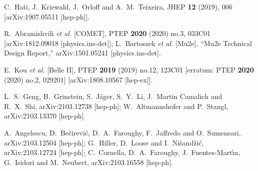 \documentclass[a4paper,11pt]{article}
\begin{document}
\begin{thebibliography}{99}
{
C.~Hati, J.~Kriewald, J.~Orloff and A.~M.~Teixeira,
JHEP \textbf{12} (2019), 006
[arXiv:1907.05511 [hep-ph]].

R.~Abramishvili \textit{et al.} [COMET],
PTEP \textbf{2020} (2020) no.3, 033C01
[arXiv:1812.09018 [physics.ins-det]];
L.~Bartoszek \textit{et al.} [Mu2e],
``Mu2e Technical Design Report,''
arXiv:1501.05241 [physics.ins-det].

E.~Kou \textit{et al.} [Belle II],
PTEP \textbf{2019} (2019) no.12, 123C01
[erratum: PTEP \textbf{2020} (2020) no.2, 029201]
[arXiv:1808.10567 [hep-ex]].

L.~S.~Geng, B.~Grinstein, S.~J\"ager, S.~Y.~Li, J.~Martin Camalich and R.~X.~Shi,
arXiv:2103.12738 [hep-ph];
W.~Altmannshofer and P.~Stangl,
arXiv:2103.13370 [hep-ph].

A.~Angelescu, D.~Be\v{c}irevi\'c, D.~A.~Faroughy, F.~Jaffredo and O.~Sumensari,
arXiv:2103.12504 [hep-ph];
G.~Hiller, D.~Loose and I.~Ni\v{s}and\v{z}i\'c,
arXiv:2103.12724 [hep-ph];
C.~Cornella, D.~A.~Faroughy, J.~Fuentes-Mart\'\i{}n, G.~Isidori and M.~Neubert,
arXiv:2103.16558 [hep-ph].
}

\end{thebibliography}
\end{document}
